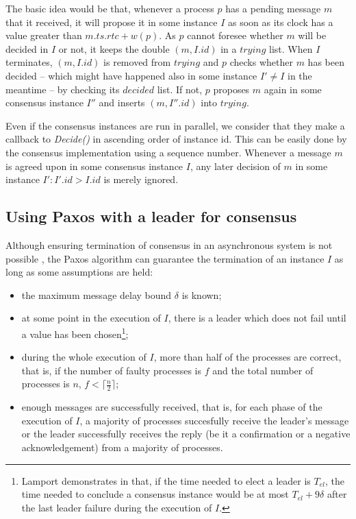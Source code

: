 \documentclass[times, 10pt]{article}
\begin{document}
The basic idea would be that, whenever a process $p$ has a pending message $m$ that it received, it will propose it in some instance $I$ as soon as its clock has a value greater than $m.ts.rtc + w(p)$. As $p$ cannot foresee whether $m$ will be decided in $I$ or not, it keeps the double $(m,I.id)$ in a $trying$ list. When $I$ terminates, $(m,I.id)$ is removed from $trying$ and $p$ checks whether $m$ has been decided -- which might have happened also in some instance $I' \neq I$ in the meantime -- by checking its $decided$ list. If not, $p$ proposes $m$ again in some consensus instance $I''$ and inserts $(m,I''.id)$ into $trying$.

Even if the consensus instances are run in parallel, we consider that they make a callback to \emph{Decide()} in ascending order of instance id. This can be easily done by the consensus implementation using a sequence number. Whenever a message $m$ is agreed upon in some consensus instance $I$, any later decision of $m$ in some instance \mbox{$I' : I'.id > I.id$} is merely ignored.



\subsection{Using Paxos with a leader for consensus}

Although ensuring termination of consensus in an asynchronous system is not possible \cite{fischer1985idc}, the Paxos \cite{lamport1998ptp} algorithm can guarantee the termination of an instance $I$ as long as some assumptions are held:

\begin{itemize}
  \item the maximum message delay bound $\delta$ is known;
  \item at some point in the execution of $I$, there is a leader which does not fail until a value has been chosen\footnote{Lamport demonstrates in \cite{lamport1998ptp} that, if the time needed to elect a leader is $T_{el}$, the time needed to conclude a consensus instance would be at most $T_{el} + 9\delta$ after the last leader failure during the execution of $I$.};
  \item during the whole execution of $I$, more than half of the processes are correct, that is, if the number of faulty processes is $f$ and the total number of processes is $n$, $f < \lceil \frac{n}{2} \rceil$;
  \item enough messages are successfully received, that is, for each phase of the execution of $I$, a majority of processes succesfully receive the leader's message or the leader successfully receives the reply (be it a confirmation or a negative acknowledgement) from a majority of processes.
\end{itemize}
\end{document}
